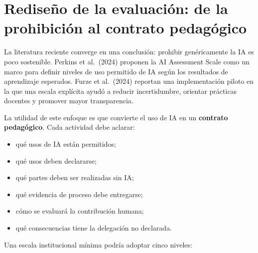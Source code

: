 \documentclass[
  spanish,
  letterpaper,
  DIV=11,
  numbers=noendperiod]{scrartcl}
\providecommand{\tightlist}{%
  \setlength{\itemsep}{0pt}\setlength{\parskip}{0pt}}
\begin{document}
\section{Rediseño de la evaluación: de la prohibición al contrato
pedagógico}\label{rediseuxf1o-de-la-evaluaciuxf3n-de-la-prohibiciuxf3n-al-contrato-pedaguxf3gico}

La literatura reciente converge en una conclusión: prohibir
genéricamente la IA es poco sostenible. Perkins et al.~(2024) proponen
la AI Assessment Scale como un marco para definir niveles de uso
permitido de IA según los resultados de aprendizaje esperados. Furze et
al.~(2024) reportan una implementación piloto en la que una escala
explícita ayudó a reducir incertidumbre, orientar prácticas docentes y
promover mayor transparencia.

La utilidad de este enfoque es que convierte el uso de IA en un
\textbf{contrato pedagógico}. Cada actividad debe aclarar:

\begin{itemize}
\tightlist
\item
  qué usos de IA están permitidos;
\item
  qué usos deben declararse;
\item
  qué partes deben ser realizadas sin IA;
\item
  qué evidencia de proceso debe entregarse;
\item
  cómo se evaluará la contribución humana;
\item
  qué consecuencias tiene la delegación no declarada.
\end{itemize}

Una escala institucional mínima podría adoptar cinco niveles:
\end{document}
